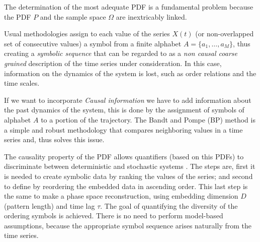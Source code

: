 The determination of the most adequate PDF is a fundamental problem because the PDF $P$ and the sample space $\Omega$ are inextricably linked.

Usual methodologies assign to each value of the series $X(t)$ (or non-overlapped set of consecutive values) a symbol from a finite alphabet $A=\{a_1,\dots,a_M\}$, thus creating a {\it symbolic sequence} that can be regarded to as a {\it non causal coarse grained\/} description of the time series under consideration. 
In this case, information on the dynamics of the system is lost, such as order relations and the time scales.

If we want to incorporate {\it Causal information\/} we have to add information about the past dynamics of the system, this is done by the assignment of symbols of alphabet $A$ to a portion of the trajectory.
The Bandt and Pompe (BP)\cite{Bandt2002} method is a simple and robust methodology that compares neighboring values in a time series and, thus solves this issue.

The causality property of the PDF allows quantifiers (based on this PDFs) to discriminate between deterministic and stochastic systems \cite{Rosso2007B}.
The steps are, first it is needed to create  symbolic data by ranking the values of the series; and second to define by reordering the embedded data in ascending order.
This last step is the same to make a phase space reconstruction, using embedding dimension $D$ (pattern length) and time lag $\tau$.
The goal of quantifying the diversity of the ordering symbols is achieved.
There is no need to perform model-based assumptions, because the appropriate symbol sequence arises naturally from the time series.

